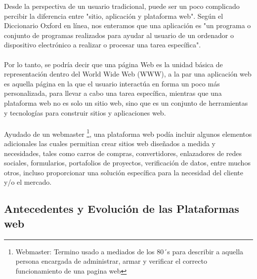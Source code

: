 \begin{large}
Desde la perspectiva de un usuario tradicional, puede ser un poco complicado percibir la diferencia entre "sitio, aplicación y plataforma web". Según el Diccionario Oxford en línea, nos enteramos que una aplicación es "un programa o conjunto de programas realizados para ayudar al usuario de un ordenador o dispositivo electrónico a realizar o procesar una tarea específica". 
\\
\\
Por lo tanto, se podría decir que una página Web es la unidad básica de representación dentro del World Wide Web (WWW), a la par una aplicación web es aquella página en la que el usuario interactúa en forma un poco más personalizada, para llevar a cabo una tarea específica, mientras que una plataforma web no es solo un sitio web, sino que es un conjunto de herramientas y tecnologías para construir sitios y aplicaciones web.
\\
\\
Ayudado de un webmaster \footnote{ Webmaster: Termino usado a mediados de los 80´s para describir a aquella persona encargada de administrar, armar y verificar el correcto funcionamiento de una pagina web}, una plataforma web podía incluir algunos elementos adicionales las cuales permitian crear sitios web diseñados a medida y necesidades, tales como carros de compras, convertidores, enlazadores de redes sociales, formularios, portafolios de proyectos, verificación de datos, entre muchos otros, incluso proporcionar una solución específica para la necesidad del cliente y/o el mercado.

\subsection{Antecedentes y Evolución de las Plataformas web}


\end{large}
